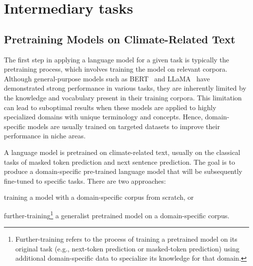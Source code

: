 \section{Intermediary tasks}
\label{sec:intermediary tasks}


\subsection{Pretraining Models on Climate-Related Text}
\label{sec:domain specific model}

The first step in applying a language model for a given task is typically the pretraining process, which involves training the model on relevant corpora. Although general-purpose models such as BERT~\cite{devlin-etal-2019-bert} and LLaMA~\cite{touvron2023llamaopenefficientfoundation} have demonstrated strong performance in various tasks, they are inherently limited by the knowledge and vocabulary present in their training corpora. This limitation can lead to suboptimal results when these models are applied to highly specialized domains with unique terminology and concepts. Hence, domain-specific models are usually trained on targeted datasets to improve their performance in niche areas.


\task A language model is pretrained on climate-related text, usually on the classical tasks of masked token prediction and next sentence prediction. The goal is to produce a domain-specific pre-trained language model that will be subsequently fine-tuned to specific tasks. There are two approaches: \begin{enumerate*} \item training a model with a domain-specific corpus from scratch, or \item further-training\footnote{Further-training refers to the process of training a pretrained model on its original task (e.g., next-token prediction or masked-token prediction) using additional domain-specific data to specialize its knowledge for that domain.} a generalist pretrained model on a domain-specific corpus.
\end{enumerate*}


